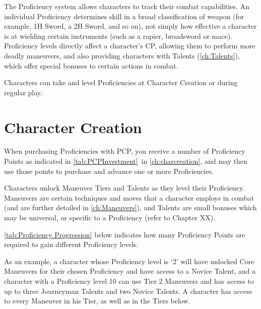 \documentclass[oneside,11pt,english]{book}
\begin{document}
The Proficiency system allows characters to track their combat capabilities. An individual Proficiency 
determines skill in a broad classification of weapon (for example, 1H Sword, a 2H Sword, and so on), not simply how effective a character is at wielding certain instruments (such as a rapier, broadsword or 
mace). Proficiency levels directly affect a character’s CP, allowing them to perform more deadly 
maneuvers, and also providing characters with Talents (\autoref{ch:Talents}), which offer special bonuses to certain actions in combat.

Characters can take and level Proficiencies at Character Creation or during regular play.

\section{Character Creation}
When purchasing Proficiencies with PCP, you receive a number of Proficiency Points as indicated in \autoref{tab:PCPInvestment}~in \autoref{ch:charcreation}, and may then use those points to purchase and advance one or more Proficiencies.

Characters unlock Maneuver Tiers and Talents as they level their Proficiency. Maneuvers are certain 
techniques and moves that a character employs in combat (and are further detailed in \autoref{ch:Maneuvers}), and 
Talents are small bonuses which may be universal, or specific to a Proficiency (refer to Chapter XX). 

\autoref{tab:Proficiency Progression} below indicates how many Proficiency Points are required to gain different Proficiency levels. 

As an example, a character whose Proficiency level is ‘2’ will have unlocked Core Maneuvers for their 
chosen Proficiency and have access to a Novice Talent, and a character with a Proficiency level 10 can 
use Tier 2 Maneuvers and has access to up to three Journeyman Talents and two Novice Talents. A 
character has access to every Maneuver in his Tier, as well as in the Tiers below. 
\end{document}
